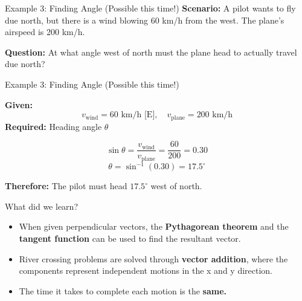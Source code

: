 \documentclass{beamer}
\begin{document}
\begin{frame}{Example 3: Finding Angle (Possible this time!)}
\textbf{Scenario:} A pilot wants to fly due north, but there is a wind blowing 60 km/h from the west.  
The plane’s airspeed is 200 km/h.

\vspace{0.3cm}

\textbf{Question:} At what angle west of north must the plane head to actually travel due north?

\vspace{0.3cm}


\begin{center}
\end{center}
\end{frame}


\begin{frame}{Example 3: Finding Angle (Possible this time!)}

\textbf{Given:}
\[
v_{\text{wind}} = 60 \text{ km/h [E]}, \quad v_{\text{plane}} = 200 \text{ km/h}
\]
\textbf{Required:} Heading angle \(\theta\)

\[
\sin\theta = \frac{v_{\text{wind}}}{v_{\text{plane}}}
= \frac{60}{200} = 0.30
\]
\[
\theta = \sin^{-1}(0.30) = 17.5^\circ
\]

\textbf{Therefore:} The pilot must head \(17.5^\circ\) west of north.

\vspace{0.4cm}

\end{frame}

\begin{frame}{What did we learn?}
\begin{itemize}
\item When given perpendicular vectors, the \textbf{Pythagorean theorem} and the \textbf{tangent function} can be used to find the resultant vector.  
\item River crossing problems are solved through \textbf{vector addition}, where the components represent independent motions in the x and y direction.  
\item The time it takes to complete each motion is the \textbf{same.}
\end{itemize}
\end{frame}
\end{document}

